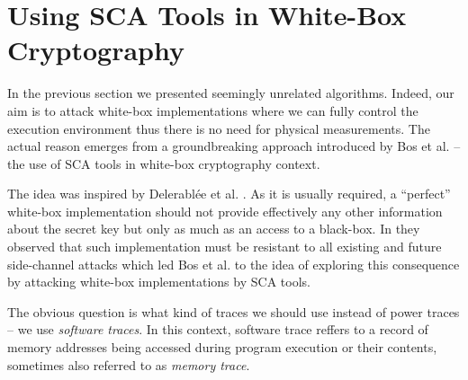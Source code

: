\section{Using SCA Tools in White-Box Cryptography}
\label{sec:scawbc}


In the previous section we presented seemingly unrelated algorithms. Indeed, our aim is to attack white-box implementations where we can fully control the execution environment thus there is no need for physical measurements. The actual reason emerges from a groundbreaking approach introduced by Bos et al. \cite{bos2015differential} -- the use of SCA tools in white-box cryptography context.

The idea was inspired by Delerabl{\'e}e et al. \cite{delerablee2013white}. As it is usually required, a ``perfect'' white-box implementation should not provide effectively any other information about the secret key but only as much as an access to a black-box. In \cite{delerablee2013white} they observed that such implementation must be resistant to all existing and future side-channel attacks which led Bos et al. to the idea of exploring this consequence by attacking white-box implementations by SCA tools.

The obvious question is what kind of traces we should use instead of power traces -- we use {\em software traces}. In this context, software trace reffers to a record of memory addresses being accessed during program execution or their contents, sometimes also referred to as {\em memory trace}.

